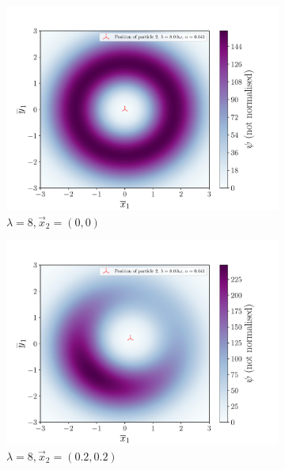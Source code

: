 \documentclass[a4paper,DIV=12,english]{scrartcl}
\begin{document}
\begin{figure}
\begin{subfigure}{0.32\textwidth}
        \includegraphics[width=\textwidth]{../plots/wf/wf_0_0_lambda8.pdf}
        \caption{$\lambda=8, \vec{x}_2 = (0, 0)$}
        \label{subfig:wf_0_0_8}
    \end{subfigure}
    \begin{subfigure}{0.32\textwidth}
        \centering
        \includegraphics[width=\textwidth]{../plots/wf/wf_02_02_lambda8.pdf}
        \caption{$\lambda=8, \vec{x}_2 = (0.2, 0.2)$}
        \label{subfig:wf_02_02_8}
    \end{subfigure}
    \begin{subfigure}{0.32\textwidth}
        \centering

\end{subfigure}
\end{figure}
\end{document}
